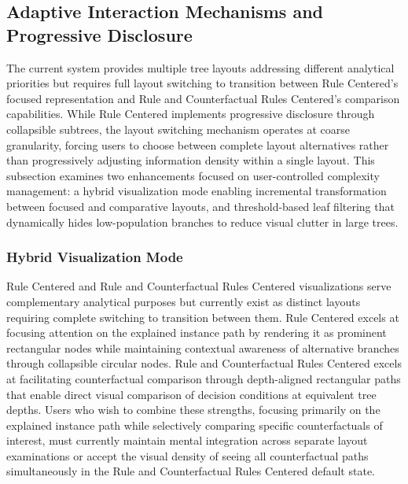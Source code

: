 \subsection{Adaptive Interaction Mechanisms and Progressive Disclosure}

The current system provides multiple tree layouts addressing different analytical priorities but requires full layout switching to transition between Rule Centered's focused representation and Rule and Counterfactual Rules Centered's comparison capabilities. While Rule Centered implements progressive disclosure through collapsible subtrees, the layout switching mechanism operates at coarse granularity, forcing users to choose between complete layout alternatives rather than progressively adjusting information density within a single layout. This subsection examines two enhancements focused on user-controlled complexity management: a hybrid visualization mode enabling incremental transformation between focused and comparative layouts, and threshold-based leaf filtering that dynamically hides low-population branches to reduce visual clutter in large trees.

\subsubsection{Hybrid Visualization Mode}

Rule Centered and Rule and Counterfactual Rules Centered visualizations serve complementary analytical purposes but currently exist as distinct layouts requiring complete switching to transition between them. Rule Centered excels at focusing attention on the explained instance path by rendering it as prominent rectangular nodes while maintaining contextual awareness of alternative branches through collapsible circular nodes. Rule and Counterfactual Rules Centered excels at facilitating counterfactual comparison through depth-aligned rectangular paths that enable direct visual comparison of decision conditions at equivalent tree depths. Users who wish to combine these strengths, focusing primarily on the explained instance path while selectively comparing specific counterfactuals of interest, must currently maintain mental integration across separate layout examinations or accept the visual density of seeing all counterfactual paths simultaneously in the Rule and Counterfactual Rules Centered default state.

